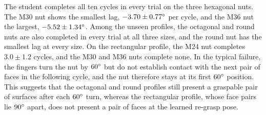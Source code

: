 The student completes all ten cycles in every trial on the three hexagonal nuts. The M30 nut shows the smallest lag, $-3.70\pm0.77^\circ$ per cycle, and the M36 nut the largest, $-5.52\pm1.34^\circ$. Among the unseen profiles, the octagonal and round nuts are also completed in every trial at all three sizes, and the round nut has the smallest lag at every size. On the rectangular profile, the M24 nut completes $3.0\pm1.2$ cycles, and the M30 and M36 nuts complete none. In the typical failure, the fingers turn the nut by $60^\circ$ but do not establish contact with the next pair of faces in the following cycle, and the nut therefore stays at its first $60^\circ$ position. This suggests that the octagonal and round profiles still present a graspable pair of surfaces after each $60^\circ$ turn, whereas the rectangular profile, whose face pairs lie $90^\circ$ apart, does not present a pair of faces at the learned re-grasp pose.

